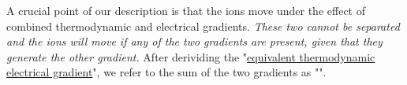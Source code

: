 A crucial point of our description is that the ions move under the effect of combined thermodynamic and electrical gradients.
\textit{ These two cannot be separated and the ions will move if any of the two gradients are present, given that they generate the other gradient.} After derividing the "\hyperlink{ThermodynamicElectricField}{equivalent thermodynamic electrical gradient}", we refer to the sum of the two gradients as "".





